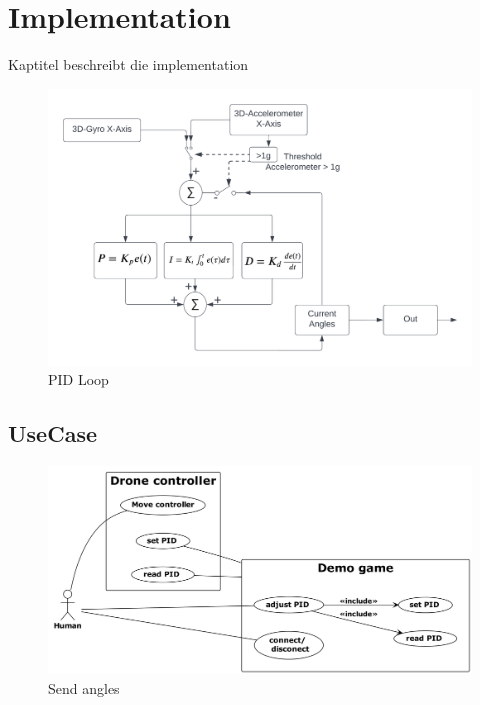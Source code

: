 \section{Implementation}
Kaptitel beschreibt die implementation

\begin{figure}[H]
  \begin{center}
    \includegraphics[width=1\linewidth]{content/images/PID_Loop.png}
    \caption{PID Loop}
  \end{center}
\end{figure}

\subsection{UseCase}
\begin{figure}[H]
  \begin{center}
    \includegraphics[width=0.8\linewidth]{content/diagrams/out/usecase/sendAngles.png}
    \caption{Send angles}
  \end{center}
\end{figure}

